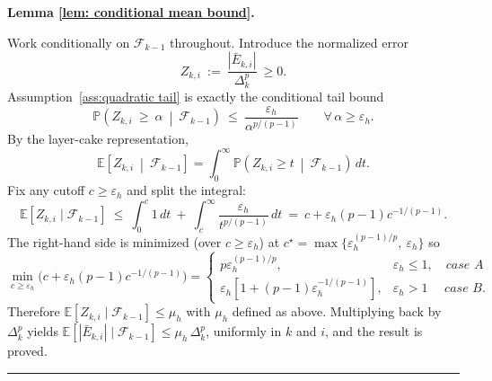 \documentclass[11pt,a4paper]{article}
\newenvironment{proof}[1][Proof]{%
  \par\noindent\textbf{#1.}\ %
}{%
  \par\vspace{-0.5 ex}            %
  \noindent\hfill\rule{0.5em}{0.5em}\par
  \vspace{1ex}
}
\newcommand{\Dexp}{p}
\newcommand{\aexp}{\Dexp/(\Dexp-1)}
\begin{document}
\begin{proof}[Lemma \ref{lem: conditional mean bound}]
Work conditionally on $\mathcal F_{k-1}$ throughout. Introduce the normalized error
\[
Z_{k,i}\ :=\ \frac{|\bar E_{k,i}|}{\Delta_k^{\Dexp}}\ \ge 0 .
\]
Assumption~\ref{ass:quadratic tail} is exactly the conditional tail bound
\[
\mathbb{P}\!\left(Z_{k,i}\ \ge\ \alpha\ \middle|\ \mathcal F_{k-1}\right)\ \le\ \frac{\varepsilon_h}{\alpha^{\aexp}}
\qquad\forall\,\alpha\ge\varepsilon_h.
\]
By the layer-cake representation,
\[
\mathbb{E}\!\left[Z_{k,i}\ \middle|\ \mathcal F_{k-1}\right]
=\int_0^\infty \mathbb{P}\!\left(Z_{k,i}\ge t\ \middle|\ \mathcal F_{k-1}\right)\,dt.
\]
Fix any cutoff $c\ge\varepsilon_h$ and split the integral:
\[
\mathbb{E}[Z_{k,i}\mid\mathcal F_{k-1}]
\ \le\ \int_0^{c} 1\,dt
\ +\ \int_{c}^{\infty} \frac{\varepsilon_h}{t^{\aexp}}\,dt
\ =\ c+\varepsilon_h(\Dexp-1)c^{-1/(\Dexp-1)}.
\]
The right-hand side is minimized (over $c\ge\varepsilon_h$) at
\(
c^\star=\max\{\varepsilon_h^{(\Dexp-1)/\Dexp},\ \varepsilon_h\}
\)
so
\[
\min_{c\ge\varepsilon_h}\Big(c+\varepsilon_h(\Dexp-1)c^{-1/(\Dexp-1)}\Big)
=
\begin{cases}
\Dexp \varepsilon_h^{(\Dexp-1)/\Dexp}, & \varepsilon_h\le 1, \quad \textit{case A}\\[3pt]
\varepsilon_h \left[ 1+ (\Dexp-1)\varepsilon_h^{-1/(\Dexp-1)}\right], & \varepsilon_h>1 \quad \textit{ case B}.
\end{cases}
\]
Therefore
\(
\mathbb{E}[Z_{k,i}\mid\mathcal F_{k-1}]\le \mu_h
\)
with
$\mu_h$ defined as above.
Multiplying back by $\Delta_k^{\Dexp}$ yields
\(
\mathbb{E}[|\bar E_{k,i}|\mid\mathcal F_{k-1}]\le \mu_h\,\Delta_k^{\Dexp}
\),
uniformly in $k$ and $i$, and the result is proved.
\end{proof}
\end{document}
